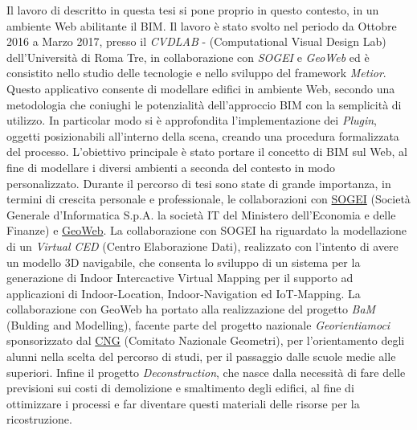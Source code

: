 Il lavoro di descritto in  questa tesi si pone proprio in questo contesto, in un ambiente Web abilitante il BIM.
Il lavoro è stato svolto nel periodo da Ottobre 2016 a Marzo 2017, presso il \emph{CVDLAB} - (Computational Visual Design Lab)
dell'Università di Roma Tre, in collaborazione con \emph{SOGEI} e \emph{GeoWeb}
ed è consistito nello studio delle tecnologie e nello sviluppo del framework \emph{Metior}.
Questo applicativo consente di modellare edifici in ambiente Web, secondo una metodologia che coniughi le potenzialità
dell’approccio BIM con la semplicità di utilizzo.
In particolar modo si è approfondita l'implementazione dei \emph{Plugin}, oggetti posizionabili all'interno della scena, creando
una procedura formalizzata del processo.
L'obiettivo principale è stato portare il concetto di BIM sul Web, al fine di modellare i diversi ambienti a seconda del
contesto in modo personalizzato.
Durante il percorso di tesi sono state di grande importanza, in termini di crescita personale e professionale,
le collaborazioni con \href{http://www.sogei.it/flex/cm/pages/ServeBLOB.php/L/IT/IDPagina/116}{SOGEI}
(Società Generale d'Informatica S.p.A. la società IT del Ministero dell'Economia e delle Finanze)
e \href{http://www.geoweb.it/}{GeoWeb}.
La collaborazione con SOGEI ha riguardato la modellazione di un \emph{Virtual CED} (Centro Elaborazione Dati),
realizzato con l'intento di avere un modello 3D navigabile, che consenta lo sviluppo di un sistema per
la generazione di Indoor Intercactive Virtual Mapping per il supporto ad applicazioni di Indoor-Location, Indoor-Navigation
ed IoT-Mapping.
La collaborazione con GeoWeb ha portato alla realizzazione del progetto \emph{BaM} (Bulding and Modelling),
facente parte del progetto nazionale \emph{Georientiamoci}
sponsorizzato dal \href{http://www.cng.it/it/consiglio-nazionale}{CNG} (Comitato Nazionale Geometri),
per l'orientamento degli alunni nella scelta del percorso di studi,
per il passaggio dalle scuole medie alle superiori.
Infine il progetto \emph{Deconstruction}, che nasce dalla necessità di fare delle previsioni
sui costi di demolizione e smaltimento degli edifici, al fine di ottimizzare i processi e far
diventare questi materiali delle risorse per la ricostruzione.
\newpage
